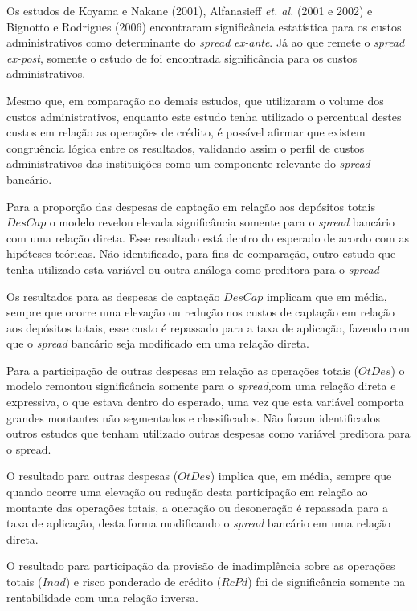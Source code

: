 \documentclass[
  12pt,
  12pt,
  openright,
  oneside,
  a4paper,
  chapter=TITLE,
  section=TITLE,
  subsection=TITLE,
  subsubsection=TITLE,
  portugues,
  sumario=tradicional]{abntex2}
\begin{document}
Os estudos de Koyama e Nakane (2001), Alfanasieff \emph{et. al.} (2001 e 2002) e Bignotto e Rodrigues (2006) encontraram significância estatística para os custos administrativos como determinante do \emph{spread ex-ante}. Já ao que remete o \emph{spread ex-post}, somente o estudo de \textcite{almeida:2013} foi encontrada significância para os custos administrativos.

Mesmo que, em comparação ao demais estudos, que utilizaram o volume dos custos administrativos, enquanto este estudo tenha utilizado o percentual destes custos em relação as operações de crédito, é possível afirmar que existem congruência lógica entre os resultados, validando assim o perfil de custos administrativos das instituições como um componente relevante do \emph{spread} bancário.

Para a proporção das despesas de captação em relação aos depósitos totais \(DesCap\) o modelo revelou elevada significância somente para o \emph{spread} bancário com uma relação direta. Esse resultado está dentro do esperado de acordo com as hipóteses teóricas. Não identificado, para fins de comparação, outro estudo que tenha utilizado esta variável ou outra análoga como preditora para o \emph{spread}

Os resultados para as despesas de captação \(DesCap\) implicam que em média, sempre que ocorre uma elevação ou redução nos custos de captação em relação aos depósitos totais, esse custo é repassado para a taxa de aplicação, fazendo com que o \emph{spread} bancário seja modificado em uma relação direta.

Para a participação de outras despesas em relação as operações totais (\(OtDes\)) o modelo remontou significância somente para o \emph{spread},com uma relação direta e expressiva, o que estava dentro do esperado, uma vez que esta variável comporta grandes montantes não segmentados e classificados. Não foram identificados outros estudos que tenham utilizado outras despesas como variável preditora para o spread.

O resultado para outras despesas (\(OtDes\)) implica que, em média, sempre que quando ocorre uma elevação ou redução desta participação em relação ao montante das operações totais, a oneração ou desoneração é repassada para a taxa de aplicação, desta forma modificando o \emph{spread} bancário em uma relação direta.

O resultado para participação da provisão de inadimplência sobre as operações totais (\(Inad\)) e risco ponderado de crédito (\(RcPd\)) foi de significância somente na rentabilidade com uma relação inversa.
\end{document}

